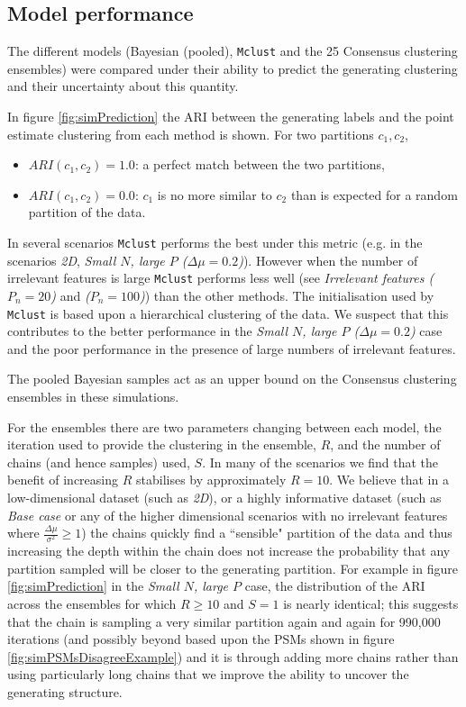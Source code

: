\documentclass[]{article}
\begin{document}
\subsection{Model performance} \label{sec:simModelPerformance}
The different models (Bayesian (pooled), \texttt{Mclust} and the 25 Consensus clustering ensembles) were compared under their ability to predict the generating clustering and their uncertainty about this quantity.

In figure \ref{fig:simPrediction} the ARI between the generating labels and the point estimate clustering from each method is shown. For two partitions $c_1, c_2$, 
\begin{itemize}
	\item $ARI(c_1, c_2) = 1.0$: a perfect match between the two partitions,
	\item $ARI(c_1, c_2) = 0.0$: $c_1$ is no more similar to $c_2$ than is expected for a random partition of the data.
\end{itemize}
In several scenarios \texttt{Mclust} performs the best under this metric (e.g. in the scenarios \emph{2D}, \emph{Small $N$, large $P$ ($\Delta \mu = 0.2$)}). However when the number of irrelevant features is large \texttt{Mclust} performs less well (see \emph{Irrelevant features ($P_n = 20$)} and \emph{($P_n = 100$)}) than the other methods. 
The initialisation used by \texttt{Mclust} is based upon a hierarchical clustering of the data. We suspect that this contributes to the better performance in the \emph{Small $N$, large $P$ ($\Delta \mu = 0.2$)} case and the poor performance in the presence of large numbers of irrelevant features.

The pooled Bayesian samples act as an upper bound on the Consensus clustering ensembles in these simulations.

For the ensembles there are two parameters changing between each model, the iteration used to provide the clustering in the ensemble, $R$, and the number of chains (and hence samples) used, $S$. In many of the scenarios we find that the benefit of increasing $R$ stabilises by approximately $R = 10$. We believe that in a low-dimensional dataset (such as \emph{2D}), or a highly informative dataset (such as \emph{Base case} or any of the higher dimensional scenarios with no irrelevant features where $\frac{\Delta \mu}{\sigma^2} \geq 1$) the chains quickly find a ``sensible" partition of the data and thus increasing the depth within the chain does not increase the probability that any partition sampled will be closer to the generating partition. For example in figure \ref{fig:simPrediction} in the \emph{Small $N$, large $P$} case, the distribution of the ARI across the ensembles for which $R\geq10$ and $S=1$ is nearly identical; this suggests that the chain is sampling a very similar partition again and again for 990,000 iterations (and possibly beyond based upon the PSMs shown in figure \ref{fig:simPSMsDisagreeExample}) and it is through adding more chains rather than using particularly long chains that we improve the ability to uncover the generating structure. 
\end{document}
